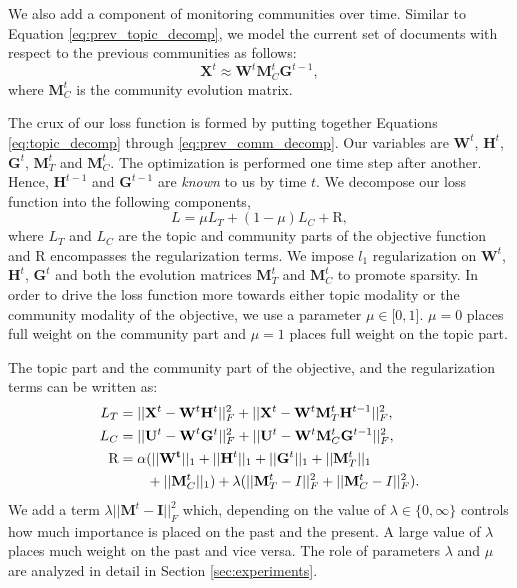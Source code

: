 We also add a component of monitoring communities over time.  Similar to Equation \ref{eq:prev_topic_decomp},
we model the current set of documents with respect to the previous communities as follows:
\begin{equation}
\mathbf{X}^t \approx \mathbf{W}^t\mathbf{M}_C^t\mathbf{G}^{t-1}, \label{eq:prev_comm_decomp}
\end{equation}
where $\mathbf{M}_C^t$ is the community evolution matrix.

The crux of our loss function is formed by putting together Equations \ref{eq:topic_decomp} through
\ref{eq:prev_comm_decomp}.  Our variables are $\mathbf{W}^t$, $\mathbf{H}^t$, $\mathbf{G}^t$, 
$\mathbf{M}_T^t$ and $\mathbf{M}_C^t$.  The optimization is performed one time step after another.
Hence, $\mathbf{H}^{t-1}$ and $\mathbf{G}^{t-1}$ are \emph{known} to us by time $t$.  We decompose
our loss function into the following components,
\begin{equation}
L = \mu L_T + (1-\mu) L_C + \text{R}, \label{eq:loss_function}
\end{equation}
where $L_T$ and $L_C$ are the topic and community parts of the objective function and R encompasses the regularization terms.
We impose $l_1$ regularization on $\mathbf{W}^t$, $\mathbf{H}^t$, $\mathbf{G}^t$ and both the evolution matrices
$\mathbf{M}_T^t$ and $\mathbf{M}_C^t$ to promote sparsity.  
In order to drive the loss function more towards either topic modality or the community modality of the objective,
we use a parameter $\mu \in \big[0,1\big]$.  $\mu = 0$ places full weight on the community part and $\mu = 1$ places
full weight on the topic part.

The topic part and the community part of the
objective, and the regularization terms can be written as:
\begin{align} 
L_T &= ||\mathbf{X}^t - \mathbf{W}^t\mathbf{H}^t||_F^2 +  ||\mathbf{X}^t - \mathbf{W}^t\mathbf{M}_T^t\mathbf{H}^{t-1}||_F^2,  \\
L_C &= ||\mathbf{U}^t - \textbf{W}^t\mathbf{G}^t||_F^2 +  ||\mathbf{U}^t - \mathbf{W}^t\mathbf{M}_C^t\mathbf{G}^{t-1}||_F^2,  \\
\text{R} &= \alpha(||\mathbf{W^t}||_1 + ||\mathbf{H}^t||_1 + ||\mathbf{G}^t||_1 + ||\mathbf{M}_T^t||_1 \nonumber \\ 
		& \qquad + ||\mathbf{M}_C^t||_1) + \lambda(||\mathbf{M}_T^t - I||_F^2 + ||\mathbf{M}_C^t - I||_F^2).
\end{align}
We add a term $\lambda||\mathbf{M}^t - \mathbf{I}||_F^2$
which, depending on the value of $\lambda \in \{0,\infty\}$ controls how much importance is placed on the past and the
present. A large value of $\lambda$ places much weight on the past and vice versa.  The role of parameters $\lambda$ and
$\mu$ are analyzed in detail in Section \ref{sec:experiments}.

